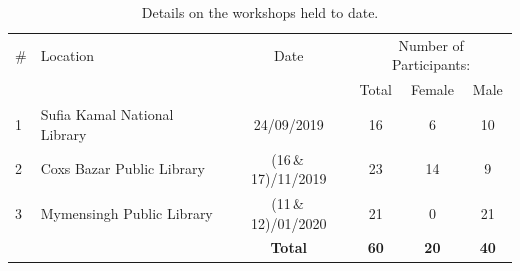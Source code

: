 \documentclass[12pt]{report} %
\begin{document}
\begin{table}[ht] 
\centering %
\begin{tabular}{l l c c c c} %
\hline %
\# & Location & Date & \multicolumn{3}{c}{Number of Participants:}\\ %
&&& Total & Female & Male\\ %
\hline
\hline
1 & Sufia Kamal National Library & 24/09/2019 & 16 & 6 & 10\\
2 & Coxs Bazar Public Library & (16\,\&\,17)/11/2019 & 23 & 14 & 9\\
3 & Mymensingh Public Library & (11\,\&\,12)/01/2020 & 21 & 0 & 21\\

\hline %
 && \textbf{Total} & \textbf{60} & \textbf{20} & \textbf{40}\\ %
\hline%
\end{tabular}
\caption{Details on the workshops held to date.} %
\label{tab:DYBworkshops} %
\end{table}


\end{document}
